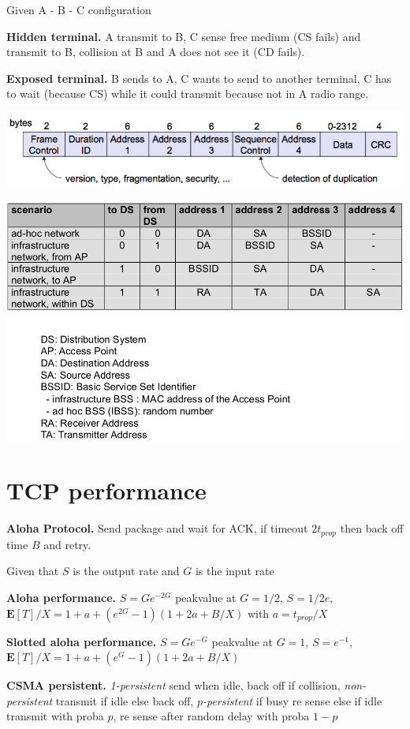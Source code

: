 \documentclass[10pt,twocolumn]{article}
\newcommand{\E}[1]{\mathbf{E}\l[#1\r]}
\renewcommand{\l}{\left}
\renewcommand{\r}{\right}
\renewcommand{\bf}{\textbf}
\begin{document}
Given A - B - C configuration

\bf{Hidden terminal.} A transmit to B, C sense free medium (CS fails) and transmit to B, collision at B and A does not see it (CD fails).

\bf{Exposed terminal.} B sends to A, C wants to send to another terminal, C has to wait (because CS) while it could transmit because not in A radio range.

\includegraphics[width=\linewidth]{figures/package-frame-1.png}

\includegraphics[width=\linewidth]{figures/package-frame-2.png}

\section{TCP performance}

\bf{Aloha Protocol.} Send package and wait for ACK, if timeout $2 t_{prop}$ then back off time $B$ and retry.


Given that $S$ is the output rate and $G$ is the input rate

\bf{Aloha performance.} $S = Ge^{-2G}$ peakvalue at $G=1/2$, $S=1/2e$, $\E{T} / X = 1 + a + (e^{2G} - 1)(1 + 2a + B/X)$ with $a=t_{prop}/X$

\bf{Slotted aloha performance.} $S = Ge^{-G}$ peakvalue at $G=1$, $S=e^{-1}$, $\E{T} / X = 1 + a + (e^G - 1)(1 + 2a + B/X)$

\bf{CSMA persistent.} \emph{1-persistent} send when idle, back off if collision, \emph{non-persistent} transmit if idle else back off, \emph{$p$-persistent} if busy re sense else if idle transmit with proba $p$, re sense after random delay with proba $1-p$
\end{document}
